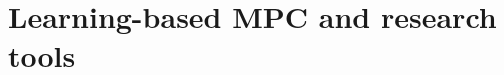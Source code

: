 \section{Learning-based MPC and research tools}
\cite{frameworks:mittal2023orbit}
\cite{frameworks:howell2022}
\cite{mpc_learn:hewing2020learning}